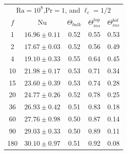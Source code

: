 \documentclass{jfm}
\begin{document}
\begin{center}
\begin{tabular}{ccccc}
    \toprule
    \multicolumn{5}{c}{$\text{Ra}=10^8$,$\text{Pr}=1$, and $\ell_c=1/2$} \\
	$f$ & $\text{Nu}$ & $\Theta_{bulk}$ & $\Theta^{top}_{ins}$ &
    $\Theta^{bot}_{ins}$ \\
    \midrule
	1 & $16.96\pm0.11$ & 0.52 & 0.55 & 0.53 \\
	2 & $17.67\pm0.03$ & 0.52 & 0.56 & 0.49 \\
	4 & $19.10\pm0.33$ & 0.55 & 0.64 & 0.45 \\
	10 & $21.98\pm0.17$ & 0.53 & 0.71 & 0.34 \\
	15 & $23.60\pm0.39$ & 0.53 & 0.74 & 0.28 \\
	20 & $24.77\pm0.26$ & 0.52 & 0.78 & 0.25 \\
	36 & $26.93\pm0.42$ & 0.51 & 0.83 & 0.18 \\
	60 & $27.76\pm0.98$ & 0.50 & 0.87 & 0.14 \\
	90 & $29.03\pm0.33$ & 0.50 & 0.89 & 0.11 \\
	180 & $30.10\pm0.97$ & 0.51 & 0.92 & 0.08 \\
    \bottomrule
\end{tabular}
\end{center}
\end{document}
